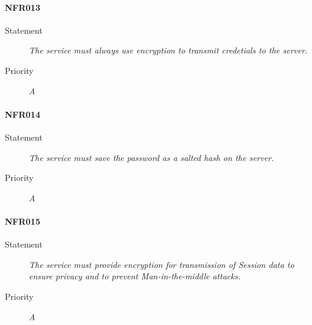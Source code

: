 \paragraph{NFR013}
\begin{description}
  \item [Statement] \textit{The service must always use encryption to transmit credetials to the server.}
  \item [Priority] \textit{A}
\end{description}

\paragraph{NFR014}
\begin{description}
  \item [Statement] \textit{The service must save the password as a salted hash on the server.}
  \item [Priority] \textit{A}
\end{description}

\paragraph{NFR015}
\begin{description}
  \item [Statement] \textit{The service must provide encryption for transmission of \gls{Session} data to ensure privacy and to prevent \gls{Man-in-the-middle attacks}.}
  \item [Priority] \textit{A}
\end{description}

